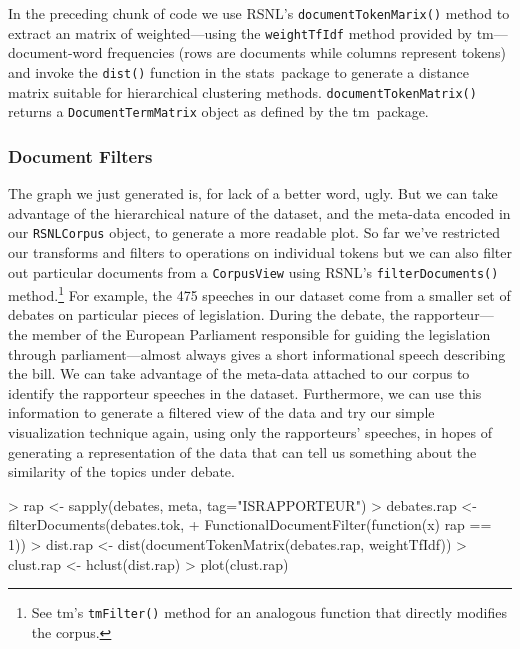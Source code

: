 \documentclass[11pt]{article}
\def\RSNL{{\normalfont\fontseries{b}\selectfont RSNL}}
\def\tm{{\normalfont\fontseries{b}\selectfont tm}}
\def\stats{{\normalfont\fontseries{b}\selectfont stats}}
\let\code=\texttt
\let\rclass=\texttt
\begin{document}
In the preceding chunk of code we use \RSNL's \code{documentTokenMarix()}
method to extract an matrix of weighted---using the
\code{weightTfIdf} method provided by \tm---document-word frequencies
(rows are documents while columns represent tokens) and invoke the
\code{dist()} function in the \stats\ package to generate a distance
matrix suitable for hierarchical clustering methods.
\code{documentTokenMatrix()} returns a \rclass{DocumentTermMatrix} object
as defined by the \tm\ package.

\subsubsection{Document Filters}

The graph we just generated is, for lack of a better word, ugly.  But
we can take advantage of the hierarchical nature of the dataset, and
the meta-data encoded in our \rclass{RSNLCorpus} object, to generate a
more readable plot.  So far we've restricted our transforms and
filters to operations on individual tokens but we can also filter out
particular documents from a \rclass{CorpusView} using \RSNL's
\code{filterDocuments()} method.\footnote{See \tm's \code{tmFilter()}
method for an analogous function that directly modifies the corpus.}  For
example, the 475 speeches in our dataset come from a smaller set of
debates on particular pieces of legislation.  During the debate, the
rapporteur---the member of the European Parliament responsible for
guiding the legislation through parliament---almost always gives a
short informational speech describing the bill.  We can take advantage
of the meta-data attached to our corpus to identify the rapporteur
speeches in the dataset.  Furthermore, we can use this information to
generate a filtered view of the data and try our simple visualization
technique again, using only the rapporteurs' speeches, in hopes of
generating a representation of the data that can tell us something
about the similarity of the topics under debate.
\begin{Schunk}
\begin{Sinput}
> rap <- sapply(debates, meta, tag="ISRAPPORTEUR")
> debates.rap <- filterDocuments(debates.tok,
+   FunctionalDocumentFilter(function(x) rap == 1))
> dist.rap <- dist(documentTokenMatrix(debates.rap, weightTfIdf))
> clust.rap <- hclust(dist.rap)
> plot(clust.rap)
\end{Sinput}
\end{Schunk}
\end{document}
